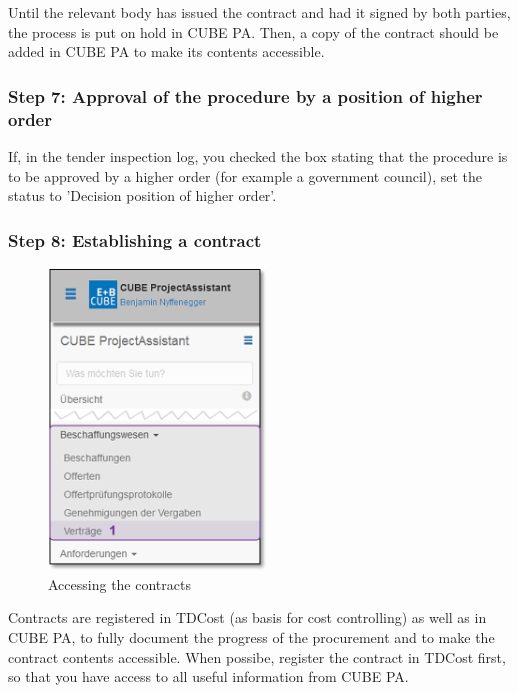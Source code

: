 \vspace{\baselineskip}

Until the relevant body has issued the contract and had it signed by both parties, the process is put on hold in CUBE PA. Then, a copy of the contract should be added in CUBE PA to make its contents accessible.

\subsubsection{Step 7: Approval of the procedure by a position of higher order}

If, in the tender inspection log, you checked the box stating that the procedure is to be approved by a higher order (for example a government council), set the status to 'Decision position of higher order'.

\subsubsection{Step 8: Establishing a contract}

\begin{figure}
  \vspace{-30pt}      %
  \begin{center}
    \includegraphics[height=80mm]{../chapters/07_Beschaffungswesen/pictures/7-1-8_Menu_Besch_Vertraege.jpg}
  \end{center}
  \vspace{-20pt}
  \caption{Accessing the contracts}
  \vspace{-10pt}
\end{figure}

Contracts are registered in TDCost (as basis for cost controlling) as well as in CUBE PA, to fully document the progress of the procurement and to make the contract contents accessible. When possibe, register the contract in TDCost first, so that you have access to all useful information 
from CUBE PA.

